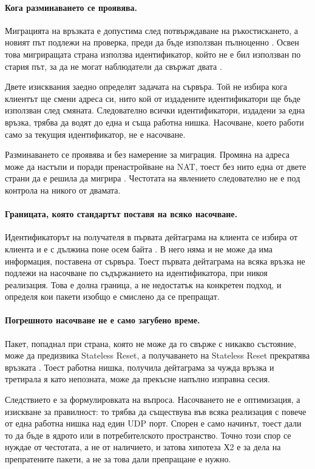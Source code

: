 \paragraph{Кога разминаването се проявява.} Миграцията на връзката е допустима след
потвърждаване на ръкостискането, а новият път подлежи на проверка, преди да бъде използван
пълноценно \cite{rfc9000}. Освен това мигриращата страна използва идентификатор, който не е
бил използван по стария път, за да не могат наблюдатели да свържат двата \cite{rfc9000}.

Двете изисквания заедно определят задачата на сървъра. Той не избира кога клиентът ще смени
адреса си, нито кой от издадените идентификатори ще бъде използван след смяната. Следователно
всички идентификатори, издадени за една връзка, трябва да водят до една и съща работна нишка.
Насочване, което работи само за текущия идентификатор, не е насочване.

Разминаването се проявява и без намерение за миграция. Промяна на адреса може да настъпи и
поради пренастройване на NAT, тоест без нито една от двете страни да е решила да мигрира
\cite{rfc9000}. Честотата на явлението следователно не е под контрола на никого от двамата.

\paragraph{Границата, която стандартът поставя на всяко насочване.} Идентификаторът на
получателя в първата дейтаграма на клиента се избира от клиента и е с дължина поне осем байта
\cite{rfc9000}. В него няма и не може да има информация, поставена от сървъра. Тоест първата
дейтаграма на всяка връзка не подлежи на насочване по съдържанието на идентификатора, при
никоя реализация. Това е долна граница, а не недостатък на конкретен подход, и определя кои
пакети изобщо е смислено да се препращат.

\paragraph{Погрешното насочване не е само загубено време.} Пакет, попаднал при страна,
която не може да го свърже с никакво състояние, може да предизвика Stateless Reset, а
получаването на Stateless Reset прекратява връзката \cite{rfc9000}. Тоест работна нишка,
получила дейтаграма за чужда връзка и третирала я като непозната, може да прекъсне напълно
изправна сесия.

Следствието е за формулировката на въпроса. Насочването не е оптимизация, а изискване за
правилност: то трябва да съществува във всяка реализация с повече от една работна нишка над
един UDP порт. Спорен е само начинът, тоест дали то да бъде в ядрото или в потребителското
пространство. Точно този спор се нуждае от честотата, а не от наличието, и затова хипотеза Х2
е за дела на препратените пакети, а не за това дали препращане е нужно.

